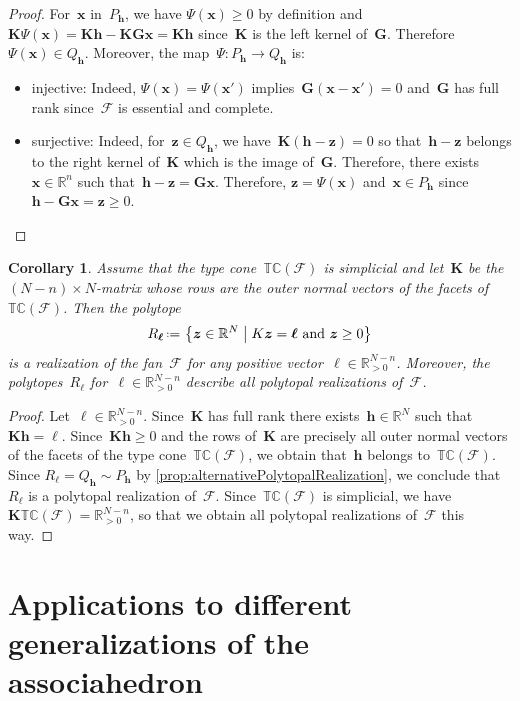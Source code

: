 \documentclass{amsart}
\newtheorem{corollary}[theorem]{Corollary}
\theoremstyle{definition}
\newcommand{\R}{\mathbb{R}} %
\renewcommand{\b}[1]{{\boldsymbol{#1}}} %
\newcommand{\set}[2]{\left\{ #1 \;\middle|\; #2 \right\}} %
\newcommand{\eqdef}{\mbox{\,\raisebox{0.2ex}{\scriptsize\ensuremath{\mathrm:}}\ensuremath{=}\,}} %
\newcommand{\Fan}{\mathcal{F}} %
\newcommand{\typeCone}{\mathbb{TC}} %
\begin{document}
\begin{proof}
For~$\b{x}$ in~$P_\b{h}$, we have $\Psi(\b{x}) \ge 0$ by definition and~$\b{K}\Psi(\b{x}) = \b{K}\b{h} - \b{K}\b{G}\b{x} = \b{K}\b{h}$ since~$\b{K}$ is the left kernel of~$\b{G}$. Therefore~$\Psi(\b{x}) \in Q_\b{h}$.
Moreover, the map~$\Psi : P_\b{h} \to Q_\b{h}$ is:
\begin{itemize}
\item injective: Indeed, $\Psi(\b{x}) = \Psi(\b{x}')$ implies~$\b{G}(\b{x} - \b{x}') = 0$ and~$\b{G}$ has full rank since~$\Fan$ is essential and complete.
\item surjective: Indeed, for~$\b{z} \in Q_\b{h}$, we have~$\b{K}(\b{h}-\b{z}) = 0$ so that~$\b{h}-\b{z}$ belongs to the right kernel of~$\b{K}$ which is the image of~$\b{G}$. Therefore, there exists~$\b{x} \in \R^n$ such that~$\b{h}-\b{z} = \b{G}\b{x}$. Therefore, $\b{z} = \Psi(\b{x})$ and~$\b{x} \in P_\b{h}$ since~$\b{h} - \b{G}\b{x} = \b{z} \ge 0$.\qedhere
\end{itemize}
\end{proof}

\begin{corollary}
\label{coro:simplicialTypeCone}
Assume that the type cone~$\typeCone(\Fan)$ is simplicial and let~$\b{K}$ be the $(N-n) \times N$-matrix whose rows are the outer normal vectors of the facets of~$\typeCone(\Fan)$. Then the polytope
\[
R_\b{\ell} \eqdef \set{\b{z} \in \R^N}{K\b{z} = \b{\ell} \text{ and } \b{z} \ge 0}
\]
is a realization of the fan~$\Fan$ for any positive vector~$\b{\ell} \in \R_{>0}^{N-n}$.
Moreover, the polytopes~$R_\b{\ell}$ for~$\b{\ell} \in \R_{>0}^{N-n}$ describe all polytopal realizations of~$\Fan$.
\end{corollary}

\begin{proof}
Let~$\b{\ell} \in \R_{>0}^{N-n}$.
Since~$\b{K}$ has full rank there exists~$\b{h} \in \R^N$ such that~$\b{K}\b{h} = \b{\ell}$.
Since~$\b{K}\b{h} \ge 0$ and the rows of~$\b{K}$ are precisely all outer normal vectors of the facets of the type cone~$\typeCone(\Fan)$, we obtain that~$\b{h}$ belongs to~$\typeCone(\Fan)$.
Since $R_\b{\ell} = Q_\b{h} \sim P_\b{h}$ by \cref{prop:alternativePolytopalRealization}, we conclude that~$R_\b{\ell}$ is a polytopal realization of~$\Fan$.
Since~$\typeCone(\Fan)$ is simplicial, we have~$\b{K}\typeCone(\Fan) = \R_{>0}^{N-n}$, so that we obtain all polytopal realizations of~$\Fan$ this way.
\end{proof}


\section{Applications to different generalizations of the associahedron}
\label{sec:applications}
\end{document}
